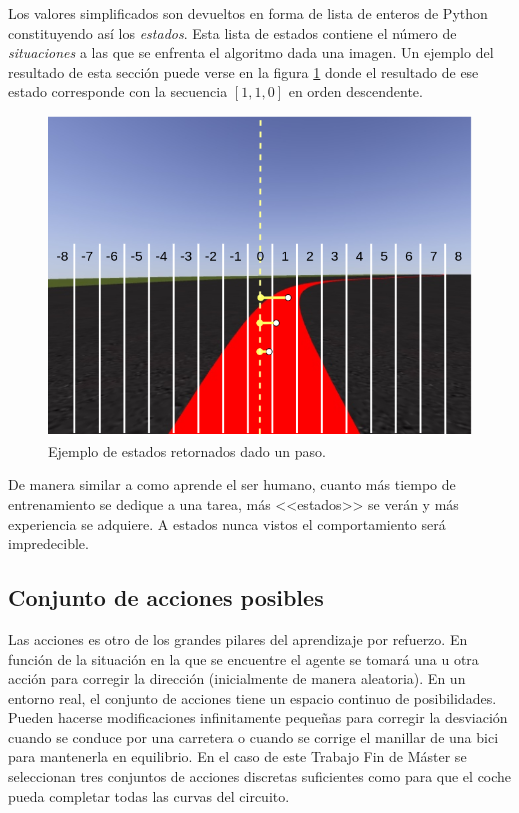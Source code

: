Los valores simplificados son devueltos en forma de lista de enteros de Python constituyendo así los \textit{estados}. Esta lista de estados contiene el número de \textit{situaciones} a las que se enfrenta el algoritmo dada una imagen. Un ejemplo del resultado de esta sección puede verse en la figura \ref{fig:ejemplo-ejecucion} donde el resultado de ese estado corresponde con la secuencia $[1, 1, 0]$ en orden descendente.\\

\begin{figure}[!ht]
    \centering \includegraphics[width=0.5\columnwidth]{./figures/chapter_4/ejemplo_ejecucion.png}
    \caption{Ejemplo de estados retornados dado un paso.}\label{fig:ejemplo-ejecucion}
\end{figure}

De manera similar a como aprende el ser humano, cuanto más tiempo de entrenamiento se dedique a una tarea, más <<estados>> se verán y más experiencia se adquiere. A estados nunca vistos el comportamiento será impredecible.


\subsection{Conjunto de acciones posibles}\label{conjunto-acciones}

Las acciones es otro de los grandes pilares del aprendizaje por refuerzo. En función de la situación en la que se encuentre el agente se tomará una u otra acción para corregir la dirección (inicialmente de manera aleatoria). En un entorno real, el conjunto de acciones tiene un espacio continuo de posibilidades. Pueden hacerse modificaciones infinitamente pequeñas para corregir la desviación cuando se conduce por una carretera o cuando se corrige el manillar de una bici para mantenerla en equilibrio. En el caso de este Trabajo Fin de Máster se seleccionan tres conjuntos de acciones discretas suficientes como para que el coche pueda completar todas las curvas del circuito.\\

